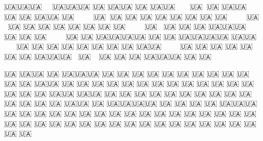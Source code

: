  
 
 
 
 

🇺🇦🇺🇦🇺🇦🤍🤍🤍🤍 🇺🇦🇺🇦🇺🇦          🇺🇦           🇺🇦🇺🇦                🇺🇦
🇺🇦🇺🇦 🤍🤍🤍🤍🤍  🇺🇦🤍🤍🇺🇦        🇺🇦🇺🇦         🇺🇦   🇺🇦           🇺🇦🇺🇦
🇺🇦 🤍  🤍🤍🤍🤍🤍  🇺🇦🤍🤍🇺🇦       🇺🇦  🇺🇦        🇺🇦    🇺🇦         🇺🇦  🇺🇦
🇺🇦 🤍  🤍🤍🤍🤍🤍  🇺🇦🤍🤍🇺🇦      🇺🇦    🇺🇦       🇺🇦     🇺🇦       🇺🇦    🇺🇦
🇺🇦 🤍  🤍🤍🤍🤍🤍  🇺🇦🤍🤍 🇺🇦     🇺🇦      🇺🇦      🇺🇦🇺🇦🇺🇦       🇺🇦      🇺🇦 
🇺🇦 🤍  🤍🤍🤍🤍🤍  🇺🇦    🇺🇦    🇺🇦🇺🇦🇺🇦🇺🇦     🇺🇦     🇺🇦     🇺🇦🇺🇦🇺🇦🇺🇦
🇺🇦🇺🇦 🤍🤍🤍🤍🤍 🇺🇦     🇺🇦   🇺🇦          🇺🇦    🇺🇦      🇺🇦   🇺🇦          🇺🇦
🇺🇦🇺🇦 🤍🤍🤍🤍🤍🇺🇦      🇺🇦  🇺🇦            🇺🇦   🇺🇦     🇺🇦   🇺🇦            🇺🇦
🇺🇦🇺🇦🇺🇦🤍🤍 🇺🇦🤍🤍🤍🤍🇺🇦 🇺🇦              🇺🇦  🇺🇦🇺🇦🇺🇦   🇺🇦              🇺🇦

🇺🇦     🇺🇦🇺🇦      🇺🇦  🇺🇦🇺🇦🇺🇦         🇺🇦        🇺🇦  🇺🇦 🇺🇦        🇺🇦  🇺🇦 
🇺🇦    🇺🇦 🇺🇦    🇺🇦    🇺🇦     🇺🇦      🇺🇦🇺🇦         🇺🇦    🇺🇦        🇺🇦  🇺🇦 
 🇺🇦  🇺🇦  🇺🇦 🇺🇦       🇺🇦      🇺🇦    🇺🇦  🇺🇦        🇺🇦    🇺🇦        🇺🇦  🇺🇦
  🇺🇦🇺🇦   🇺🇦🇺🇦        🇺🇦      🇺🇦   🇺🇦    🇺🇦       🇺🇦    🇺🇦        🇺🇦  🇺🇦
    🇺🇦     🇺🇦 🇺🇦       🇺🇦     🇺🇦   🇺🇦 🇺🇦🇺🇦       🇺🇦    🇺🇦🇺🇦🇺🇦🇺🇦  🇺🇦
   🇺🇦      🇺🇦   🇺🇦     🇺🇦🇺🇦🇺🇦   🇺🇦       🇺🇦      🇺🇦    🇺🇦        🇺🇦  🇺🇦
  🇺🇦       🇺🇦     🇺🇦   🇺🇦          🇺🇦         🇺🇦     🇺🇦    🇺🇦        🇺🇦  🇺🇦
 🇺🇦        🇺🇦      🇺🇦  🇺🇦         🇺🇦           🇺🇦    🇺🇦    🇺🇦        🇺🇦  🇺🇦
🇺🇦         🇺🇦      🇺🇦  🇺🇦        🇺🇦             🇺🇦   🇺🇦    🇺🇦        🇺🇦  🇺🇦
